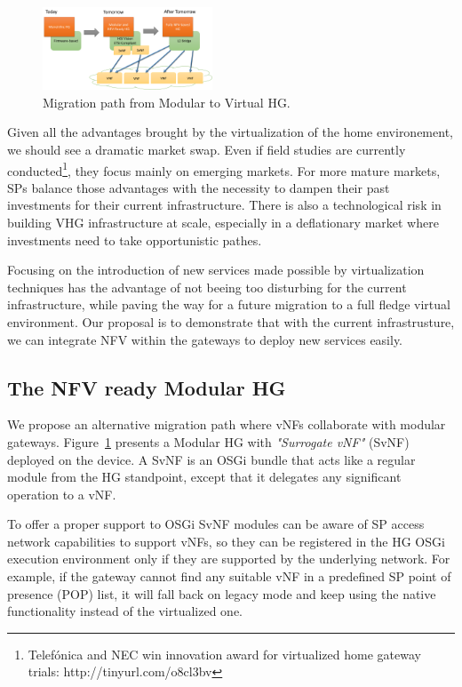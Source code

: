 \begin{figure}
  \begin{center}
    \includegraphics[width=0.45\textwidth,natwidth=6955,natheight=3398]{fig/vhgMigrationPath.png}
  \end{center}
  \caption{ Migration path from Modular to Virtual HG.
    \label{fig:migration}
  }
\end{figure}

Given all the advantages brought by the virtualization of the home environement, we should see a dramatic market swap.
Even if field studies are currently conducted\footnote{Telefónica and NEC win innovation award for virtualized home gateway trials: http://tinyurl.com/o8cl3bv}, they focus mainly on emerging markets.
For more mature markets, SPs balance those advantages with the necessity to dampen their past investments for their current infrastructure.
There is also a technological risk in building VHG infrastructure at scale, especially in a deflationary market where investments need to take opportunistic pathes. 

Focusing on the introduction of new services made possible by virtualization techniques has the advantage of not beeing too disturbing for the current infrastructure, while paving the way for a future migration to a full fledge virtual environment. Our proposal is to demonstrate that with the current infrastrusture, we can integrate NFV within the gateways to deploy new services easily.


\subsection{The NFV ready Modular HG}
We propose an alternative migration path where vNFs collaborate with modular gateways.
Figure~\ref{fig:migration} presents a Modular HG with \textit{"Surrogate vNF"} (SvNF) deployed on the device.
A SvNF is an OSGi bundle that acts like a regular module from the HG standpoint, except that it delegates any significant operation to a vNF.

To offer a proper support to OSGi SvNF modules can be aware of SP access network capabilities to support vNFs, so they can be registered in the HG OSGi execution environment only if they are supported by the underlying network.
For example, if the gateway cannot find any suitable vNF in a predefined SP point of presence (POP) list, it will fall back on legacy mode and keep using the native functionality instead of the virtualized one.

